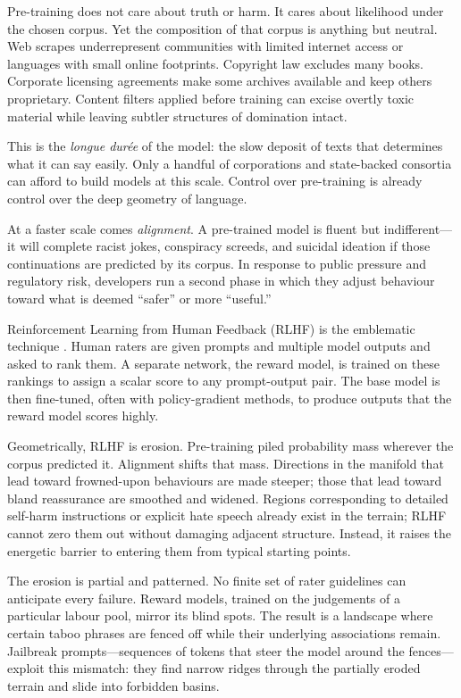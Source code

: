 \documentclass[12pt,a4paper]{article}
\begin{document}
Pre-training does not care about truth or harm. It cares about likelihood under the chosen corpus. Yet the composition of that corpus is anything but neutral. Web scrapes underrepresent communities with limited internet access or languages with small online footprints. Copyright law excludes many books. Corporate licensing agreements make some archives available and keep others proprietary. Content filters applied before training can excise overtly toxic material while leaving subtler structures of domination intact.

This is the \emph{longue dur\'ee} of the model: the slow deposit of texts that determines what it can say easily. Only a handful of corporations and state-backed consortia can afford to build models at this scale. Control over pre-training is already control over the deep geometry of language.

At a faster scale comes \emph{alignment}. A pre-trained model is fluent but indifferent---it will complete racist jokes, conspiracy screeds, and suicidal ideation if those continuations are predicted by its corpus. In response to public pressure and regulatory risk, developers run a second phase in which they adjust behaviour toward what is deemed ``safer'' or more ``useful.''

Reinforcement Learning from Human Feedback (RLHF) is the emblematic technique \cite{gabriel2020artificial,liang2022holistic}. Human raters are given prompts and multiple model outputs and asked to rank them. A separate network, the reward model, is trained on these rankings to assign a scalar score to any prompt-output pair. The base model is then fine-tuned, often with policy-gradient methods, to produce outputs that the reward model scores highly.

Geometrically, RLHF is erosion. Pre-training piled probability mass wherever the corpus predicted it. Alignment shifts that mass. Directions in the manifold that lead toward frowned-upon behaviours are made steeper; those that lead toward bland reassurance are smoothed and widened. Regions corresponding to detailed self-harm instructions or explicit hate speech already exist in the terrain; RLHF cannot zero them out without damaging adjacent structure. Instead, it raises the energetic barrier to entering them from typical starting points.

The erosion is partial and patterned. No finite set of rater guidelines can anticipate every failure. Reward models, trained on the judgements of a particular labour pool, mirror its blind spots. The result is a landscape where certain taboo phrases are fenced off while their underlying associations remain. Jailbreak prompts---sequences of tokens that steer the model around the fences---exploit this mismatch: they find narrow ridges through the partially eroded terrain and slide into forbidden basins.
\end{document}
